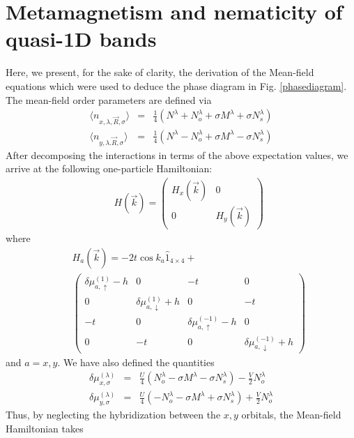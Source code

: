 \documentclass[prb,aps,amssymb,showpacs,twocolumn,amsmath,floatfix]{revtex4}
\begin{document}
\section{Metamagnetism and nematicity of quasi-1D bands}
Here, we present, for the sake of clarity, the derivation of the Mean-field equations which were used to deduce the phase diagram in Fig. \ref{phasediagram}.  The mean-field order parameters 
are defined via 
\begin{eqnarray}
\langle n_{x, \lambda, {\vec R},  \sigma } \rangle &=& \frac{1}{4} \left( N^{\lambda} + N_{o}^{\lambda} + \sigma M^{\lambda} + \sigma N_s^{ \lambda} \right) \nonumber \\
\langle n_{y , \lambda. {\vec R},  \sigma } \rangle &=& \frac{1}{4} \left( N^{\lambda} - N_{o}^{\lambda} +  \sigma M^{\lambda} - \sigma N_s^{ \lambda} \right) 
\end{eqnarray}
After decomposing the interactions in terms of the above expectation values, we 
arrive at the following one-particle Hamiltonian:
\begin{eqnarray}
&& H(\vec{k}) = \left(\begin{array}{cc}
H_{x} (\vec{k})& 0 \\
0 & H_{y} (\vec{k})\end{array} \right) 
\end{eqnarray} 
where
\begin{eqnarray}
&& H_{a}(\vec{k}) =-2t \cos{k_a} \hat{1}_{4 \times 4}  \nonumber + \\ && \left( \begin{array}{cccc}
\delta \mu_{a, \uparrow}^{(1)} - h& 0 & -t & 0  \\
0 & \delta \mu_{a, \downarrow}^{(1)}+h& 0 & -t  \\
-t & 0 & \delta \mu_{a, \uparrow}^{(-1)}-h& 0  \\
0 & -t & 0 &\delta \mu_{a, \downarrow}^{(-1)} +h \end{array} \right) \nonumber 
\end{eqnarray}
and $a = x,y$.
We have also defined the quantities
\begin{eqnarray}
\delta \mu_{x, \sigma}^{(\lambda)} &=& \frac{U}{4} \left( N_o^{\lambda} - \sigma M^{\lambda} - \sigma N_s^{\lambda} \right)
 - \frac{V}{2}N_o^{\lambda}    \nonumber \\
\delta \mu_{y ,\sigma}^{(\lambda)} &=&  \frac{U}{4} \left( -N_o^{\lambda} - \sigma M^{\lambda} + \sigma N_s^{\lambda} \right)
 + \frac{V}{2}N_o^{\lambda}  
\end{eqnarray}
Thus, by neglecting the hybridization between the $x,y$ orbitals, the Mean-field Hamiltonian takes 
\end{document}
